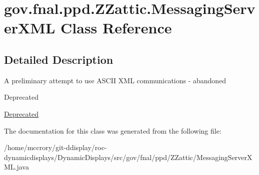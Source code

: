 \hypertarget{classgov_1_1fnal_1_1ppd_1_1ZZattic_1_1MessagingServerXML}{\section{gov.\-fnal.\-ppd.\-Z\-Zattic.\-Messaging\-Server\-X\-M\-L Class Reference}
\label{classgov_1_1fnal_1_1ppd_1_1ZZattic_1_1MessagingServerXML}
}


\subsection{Detailed Description}
A preliminary attempt to use A\-S\-C\-I\-I X\-M\-L communications -\/ abandoned \begin{DoxyRefDesc}{Deprecated}
\item[\hyperlink{deprecated__deprecated000019}{Deprecated}]\end{DoxyRefDesc}


The documentation for this class was generated from the following file\-:\begin{DoxyCompactItemize}
\item 
/home/mccrory/git-\/ddisplay/roc-\/dynamicdisplays/\-Dynamic\-Displays/src/gov/fnal/ppd/\-Z\-Zattic/Messaging\-Server\-X\-M\-L.\-java\end{DoxyCompactItemize}
